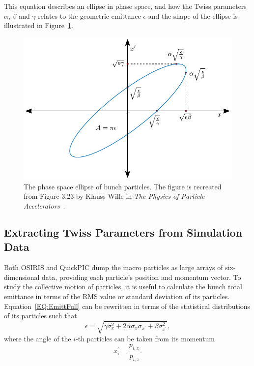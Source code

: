 This equation describes an ellipse in phase space, and how the Twiss parameters $\alpha$, $\beta$ and $\gamma$ relates to the geometric emittance $\epsilon$ and the shape of the ellipse is illustrated in Figure~\ref{Fig:Twiss}.

\begin{figure}[hbt]
    \centering
    \includegraphics[width=0.8\linewidth,trim={0mm 0mm 0mm 0mm},clip]{figures/Twiss}
    \caption{\label{Fig:Twiss} The phase space ellipse of bunch particles. The figure is recreated from Figure 3.23 by Klauss Wille in \textit{The Physics of Particle Accelerators}~\cite{wille:2001}.}
\end{figure}

\subsection{Extracting Twiss Parameters from Simulation Data}
\label{Apx:SA:EnTwiss:Sim}

Both OSIRIS and QuickPIC dump the macro particles as large arrays of six-dimensional data, providing each particle's position and momentum vector.
To study the collective motion of particles, it is useful to calculate the bunch total emittance in terms of the RMS value or standard deviation of its particles.
Equation~\ref{EQ:EmittFull} can be rewritten in terms of the statistical distributions of its particles such that
\begin{equation}
    \epsilon = \sqrt{\gamma\sigma_{x}^{2} + 2\alpha\sigma_{x}\sigma_{x^{\prime}} + \beta\sigma_{x^{\prime}}^{2}}, \label{EQ:Emitt}
\end{equation}
where the angle of the $i$-th particles can be taken from its momentum
\begin{equation}
    x_{i}^{\prime} = \frac{p_{i,x}}{p_{i,z}}.
\end{equation}

